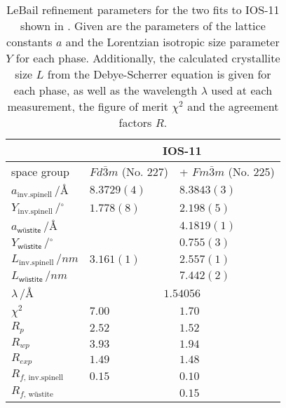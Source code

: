 \documentclass[\main/dresen_thesis.tex]{subfiles}
\begin{document}
  \begin{table}[ht]
    \centering
    \caption{\label{tab:looselyPackedNS:nanoparticle:discussion:xrdLeBail}LeBail refinement parameters for the two fits to IOS-11 shown in . Given are the parameters of the lattice constants $a$ and the Lorentzian isotropic size parameter $Y$ for each phase. Additionally, the calculated crystallite size $L$ from the Debye-Scherrer equation is given for each phase, as well as the wavelength $\lambda$ used at each measurement, the figure of merit $\chi^2$ and the agreement factors $R$.}
    \begin{tabular}{ l | l | l }
      \hline
      \rule{0pt}{2ex} & \multicolumn{2}{c}{\textbf{IOS-11}}\\
      \hline
      \hline
      \rule{0pt}{2ex}space group & $Fd\bar{3}m$ (No. 227) & + $Fm\bar{3}m$ (No. 225)\\
      \hline
      \rule{0pt}{2ex} $a_\mathrm{inv. spinell} \,/ \unit{\angstrom}$         & $8.3729(4)$ & $8.3843(3)$  \\
      \rule{0pt}{2ex} $Y_\mathrm{inv. spinell} \,/ \unit{^\circ}$            & $1.778(8)$  & $2.198(5)$   \\
      \rule{0pt}{2ex} $a_\textsf{w\"ustite}     \,/ \unit{\angstrom}$        &             & $4.1819(1)$  \\
      \rule{0pt}{2ex} $Y_\textsf{w\"ustite}     \,/ \unit{^\circ}$           &             & $0.755(3)$   \\
      \hline
      \rule{0pt}{2ex} $L_\mathrm{inv. spinell} \,/ \unit{nm}$                & $3.161(1)$  & $2.557(1)$ \\
      \rule{0pt}{2ex} $L_\textsf{w\"ustite}      \,/ \unit{nm}$              &             & $7.442(2)$ \\
      \hline
      \rule{0pt}{2ex} $\lambda \,/ \unit{\angstrom}$                         & \multicolumn{2}{c}{$1.54056$}\\
      \hline
      \rule{0pt}{2ex} $\chi^2$                                               & $7.00$      & $1.70$ \\
      \rule{0pt}{2ex} $R_p$                                                  & $2.52$      & $1.52$ \\
      \rule{0pt}{2ex} $R_{wp}$                                               & $3.93$      & $1.94$ \\
      \rule{0pt}{2ex} $R_{exp}$                                              & $1.49$      & $1.48$ \\
      \rule{0pt}{2ex} $R_{f, \, \mathrm{inv. spinell}}$                      & $0.15$      & $0.10$ \\
      \rule{0pt}{2ex} $R_{f, \, \text{w\"ustite}}$                           &             & $0.15$ \\
      \hline
    \end{tabular}
  \end{table}
\end{document}
